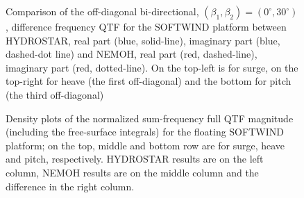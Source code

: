 \documentclass[12pt,a4paper,titlepage]{article}
\begin{document}
\begin{figure}[ht!]
{}
	\caption{Comparison of the off-diagonal bi-directional, $(\beta_1,\beta_2)=(0^{\circ},30^{\circ})$, difference frequency QTF for the SOFTWIND platform between HYDROSTAR, real part (blue, solid-line), imaginary part (blue, dashed-dot line) and NEMOH, real part (red, dashed-line), imaginary part (red, dotted-line). On the top-left is for surge, on the top-right for heave (the first off-diagonal) and the bottom for pitch (the third off-diagonal)}\label{fig:QTFM_diag_softwind}
\end{figure}



\begin{figure}[ht!]
	\centering
{}
	\caption{Density plots of the normalized sum-frequency full QTF magnitude (including the free-surface integrals) for the floating SOFTWIND platform; on the top, middle and bottom row are for surge, heave and pitch, respectively. HYDROSTAR results are on the left column, NEMOH results are on the middle column and the difference in the right column.}\label{fig:QTFP_SOFTWIND}
\end{figure}
\end{document}
